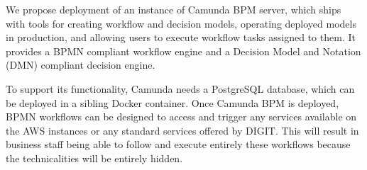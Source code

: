 	We propose deployment of an instance of Camunda BPM server, which ships with tools for creating workflow and decision models, operating deployed models in production, and allowing users to execute workflow tasks assigned to them. It provides a BPMN compliant workflow engine and a Decision Model and Notation (DMN) compliant decision engine. 
	
	To support its functionality, Camunda needs a PostgreSQL database, which can be deployed in a sibling Docker container. Once Camunda BPM is deployed, BPMN workflows can be designed to access and trigger any services available on the AWS instances or any standard services offered by DIGIT. This will result in business staff being able to follow and execute entirely these workflows because the technicalities will be entirely hidden. 
		
	